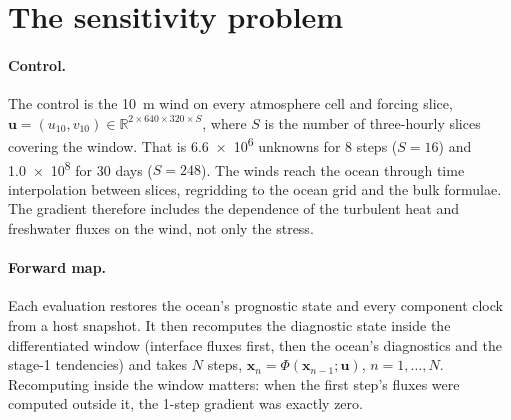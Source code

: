 \documentclass[11pt]{article}
\newcommand{\uu}{\mathbf{u}}
\newcommand{\xx}{\mathbf{x}}
\begin{document}
\section{The sensitivity problem}

\paragraph{Control.} The control is the \SI{10}{m} wind on every atmosphere cell and forcing slice,
$\uu = (u_{10}, v_{10}) \in \mathbb{R}^{2 \times 640 \times 320 \times S}$, where $S$ is the number of
three-hourly slices covering the window. That is \num{6.6e6} unknowns for 8 steps ($S = 16$) and
\num{1.0e8} for 30 days ($S = 248$). The winds reach the ocean through time interpolation between
slices, regridding to the ocean grid and the bulk formulae. The gradient therefore includes the
dependence of the turbulent heat and freshwater fluxes on the wind, not only the stress.

\paragraph{Forward map.} Each evaluation restores the ocean's prognostic state and every component
clock from a host snapshot. It then recomputes the diagnostic state inside the differentiated window
(interface fluxes first, then the ocean's diagnostics and the stage-1 tendencies) and takes $N$ steps,
$\xx_n = \Phi(\xx_{n-1}; \uu)$, $n = 1,\dots,N$. Recomputing inside the window matters: when the
first step's fluxes were computed outside it, the 1-step gradient was exactly zero.
\end{document}
